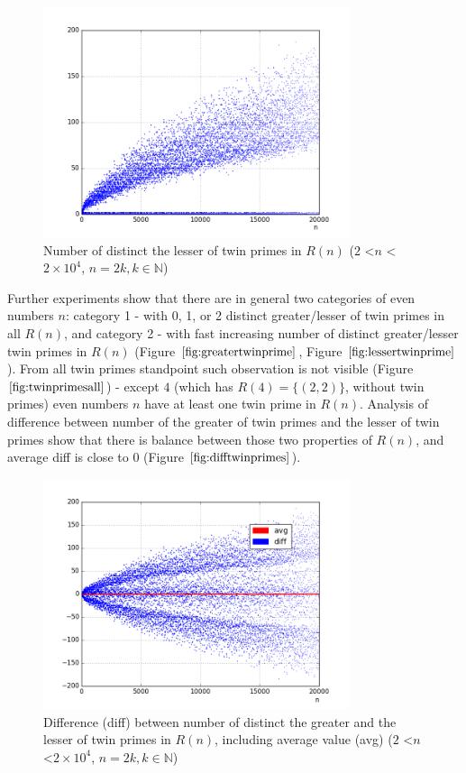 \documentclass[10pt,twocolumn]{article}
\begin{document}
\begin{figure}[!ht]
\centering
\captionsetup{justification=centering}
\includegraphics[width=9cm]{f_twin_primes_lesser_distinct}
\caption{Number of distinct the lesser of twin primes in $R(n)$ ($2$ \textless $n$ \textless $2 \times 10^4$, $n = 2k, k \in \mathbb{N}$)}
\label{fig:lessertwinprime}
\end{figure}

Further experiments show that there are in general two categories of even numbers $n$: category 1 - with 0, 1, or 2 distinct greater/lesser of twin primes in all $R(n)$, and category 2 - with fast increasing number of distinct greater/lesser twin primes in $R(n)$  (Figure $\ref{fig:greatertwinprime}$, Figure $\ref{fig:lessertwinprime}$). From all twin primes standpoint such observation is not visible (Figure $\ref{fig:twinprimesall}$) - except $4$ (which has $R(4) = \{(2,2)\}$, without twin primes) even numbers $n$ have at least one twin prime in $R(n)$. Analysis of difference between number of the greater of twin primes and the lesser of twin primes show that there is balance between those two properties of $R(n)$, and average diff is close to $0$ (Figure $\ref{fig:difftwinprimes}$).\par

\begin{figure}[!ht]
\centering
\captionsetup{justification=centering}
\includegraphics[width=9cm]{f_diff_greater_lesser_twin_primes}
\caption[caption]{Difference (diff) between number of distinct  the greater and the lesser of twin primes in $R(n)$, including average value (avg) ($2$ \textless $n$ \textless $2 \times 10^4$, $n = 2k, k \in \mathbb{N}$)}
\label{fig:difftwinprimes}
\end{figure}
\end{document}
